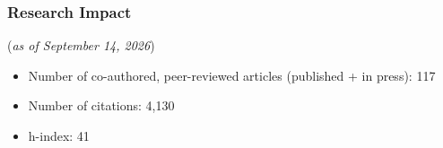 \documentclass[12pt]{article}
\begin{document}
\subsubsection*{Research Impact}
(\emph{as of September 14, 2026})
\begin{itemize}[noitemsep]
\item Number of co-authored, peer-reviewed articles (published + in press): 117
\item Number of citations: 4,130
\item h-index: 41
\end{itemize}
\end{document}
